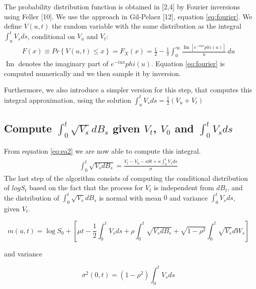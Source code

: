 \documentclass[12pt,twoside]{reedthesis}
\theoremstyle{definition}
\theoremstyle{definition}
\theoremstyle{remark}
\begin{document}
  The probability distribution function is obtained in {[}2,4{]} by
  Fourier inversions using Feller {[}10{]}. We use the approach in
  Gil-Pelaez {[}12{]}, equation \eqref{eq:fourier}. We define \(V(u,t)\) the
  random variable with the same distribution as the integral
  \(\int_{u}^{t}{V_s ds}\), conditional on \(V_u\) and \(V_t\):
  \begin{align} \label{eq:fourier}
  F(x) \equiv Pr \left\{ V(u,t) \leq x \right\} = F_{X}(x)={\frac {1}{2}}-{\frac {1}{\pi }}\int _{0}^{\infty }{\frac {\operatorname {Im} [e^{-iux} phi (u)]}{u}}\,du
  \end{align}
  \(\operatorname {Im}\) denotes the imaginary part of
  \(e^{-iux} phi (u)\). Equation \eqref{eq:fourier} is computed numerically
  and we then sample it by inversion.
  
  Furthermore, we also introduce a simpler version for this step, that
  computes this integral approximation, using the solution
  \(\int_{u}^{t}{V_s ds} = \frac{1}{2} \left( V_u + V_t \right)\)
  
  \subsection{\texorpdfstring{Compute \(\int_0^t \sqrt{V_s}dB_s\) given
  \(V_t\), \(V_0\) and
  \(\int_0^t V_sds\)}{Compute \textbackslash{}int\_0\^{}t \textbackslash{}sqrt\{V\_s\}dB\_s given V\_t, V\_0 and \textbackslash{}int\_0\^{}t V\_sds}}\label{compute-int_0t-sqrtv_sdb_s-given-v_t-v_0-and-int_0t-v_sds}
  
  From equation \eqref{eq:ea2} we are now able to compute this integral.
  \begin{align} \label{eq:ea3}
  \int_{0}^{t}{\sqrt{V_s dB_s}} = \frac{V_t - V_0 - \kappa \theta t + \kappa \int_{0}^{t}{V_s ds}}{\sigma} 
  \end{align}
  The last step of the algorithm consists of computing the conditional
  distribution of \(log S_t\) based on the fact that the process for
  \(V_t\) is independent from \(dB_t\), and the distribution of
  \(\int_0^t{\sqrt{V_s} dB_s}\) is normal with mean \(0\) and variance
  \(\int_0^t{V_s ds}\), given \(V_t\).
  
  \[m(u,t) = \log S_0 + \left[ \mu t - \frac{1}{2} \int_{0}^{t}{V_s ds} + \rho  \int_{0}^{t}{\sqrt{V_s d B_s}} + \sqrt{1 - \rho^2} \int_{0}^{t}{\sqrt{V_s} dW_s}\right]\]
  
  and variance
  
  \[\sigma^2(0,t) = \left( 1 - \rho^2 \right) \int_0^t{V_s ds}\]
  
\end{document}
